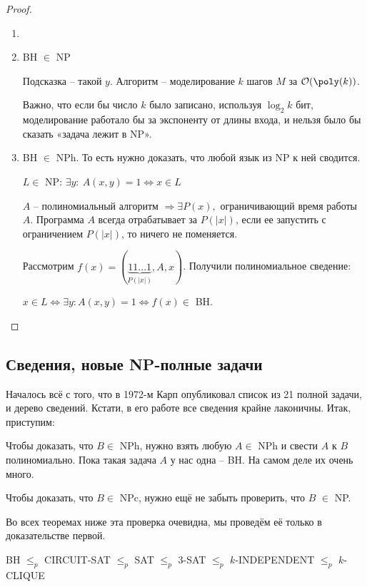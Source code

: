 \begin{proof}
    \begin{enumerate}
        \item[]
        \item BH $\in$ NP

        Подсказка – такой $y$. Алгоритм – моделирование $k$ шагов $M$ за $\mathcal{O}(\poly(k))$.

        Важно, что если бы число $k$ было записано, используя $\log_2 k$ бит, моделирование работало бы за экспоненту от длины входа, и нельзя было бы сказать «задача лежит в NP».
        \item  BH $\in$ NPh. То есть нужно доказать, что любой язык из NP к ней сводится.

        $L\in$ NP: $\exists y:\ A(x,y)=1\Leftrightarrow x\in  L$

        $A$ – полиномиальный алгоритм $\Rightarrow\exists P(x),$ ограничивающий время работы $A$. Программа $A$ всегда отрабатывает за $P(|x|)$, если ее запустить с ограничением $P(|x|)$, то ничего не поменяется.

        Рассмотрим $f(x)=(\underbrace{11...1}_{P(|x|)}, A, x)$. Получили полиномиальное сведение:

        $x\in  L\Leftrightarrow \exists y: A(x,y)=1\Leftrightarrow f(x)\in$ BH.
    \end{enumerate}
\end{proof}

\subsection{Сведения, новые NP-полные задачи}

Началось всё с того, что в 1972-м Карп опубликовал список из 21 полной задачи, и дерево сведений. Кстати, в его работе все сведения крайне лаконичны. Итак, приступим:

Чтобы доказать, что $B\in$ NPh, нужно взять любую $A\in$ NPh и свести $A$ к $B$ полиномиально. Пока такая задача $A$ у нас одна – BH. На самом деле их очень много.

Чтобы доказать, что $B\in$ NPc, нужно ещё не забыть проверить, что $B$ $\in$ NP.

Во всех теоремах ниже эта проверка очевидна, мы проведём её только в доказательстве первой.

\begin{theorem}
    BH $\leq_p$ CIRCUIT-SAT $\leq_p$ SAT $\leq_p$ 3-SAT $\leq_p$ $k$-INDEPENDENT $\leq_p$ $k$-CLIQUE
\end{theorem}

